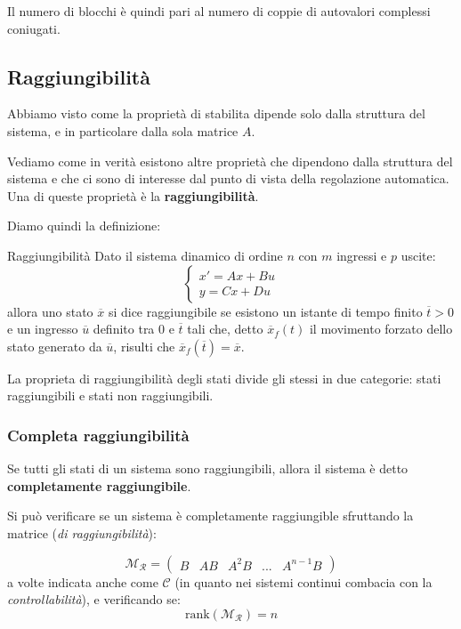 \documentclass[a4paper,11pt]{article}
\begin{document}
Il numero di blocchi è quindi pari al numero di coppie di autovalori complessi coniugati.

\subsection{Raggiungibilità}
Abbiamo visto come la proprietà di stabilita dipende solo dalla struttura del sistema, e in particolare dalla sola matrice $A$.

Vediamo come in verità esistono altre proprietà che dipendono dalla struttura del sistema e che ci sono di interesse dal punto di vista della regolazione automatica.
Una di queste proprietà è la \textbf{raggiungibilità}.

Diamo quindi la definizione:
\begin{definition}{Raggiungibilità}
	Dato il sistema dinamico di ordine $n$ con $m$ ingressi e $p$ uscite:
	\[
		\begin{cases}
			x' = Ax + Bu \\
			y = Cx + Du
		\end{cases}
	\]
		allora uno stato $\overline{x}$ si dice raggiungibile se esistono un istante di tempo finito $\overline{t} > 0$ e un ingresso $\overline{u}$ definito tra $0$ e $\overline{t}$ tali che, detto $\overline{x}_f(t)$ il movimento forzato dello stato generato da $\overline{u}$, risulti che $\overline{x}_f(\overline{t}) = \overline{x}$.
\end{definition}

La proprieta di raggiungibilità degli stati divide gli stessi in due categorie: stati raggiungibili e stati non raggiungibili.

\subsubsection{Completa raggiungibilità}
Se tutti gli stati di un sistema sono raggiungibili, allora il sistema è detto \textbf{completamente raggiungibile}.

Si può verificare se un sistema è completamente raggiungible sfruttando la matrice (\textit{di raggiungibilità}):

$$
\mathcal{M}_\mathcal{R} = \begin{pmatrix}
	B & AB & A^2B & ... & A^{n - 1}B
\end{pmatrix}
$$
a volte indicata anche come $\mathcal{C}$ (in quanto nei sistemi continui combacia con la \textit{controllabilità}), e verificando se:
$$
\mathrm{rank}(\mathcal{M}_\mathcal{R}) = n
$$
\end{document}
